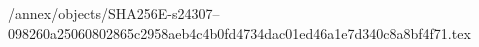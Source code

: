 /annex/objects/SHA256E-s24307--098260a25060802865c2958aeb4c4b0fd4734dac01ed46a1e7d340c8a8bf4f71.tex
